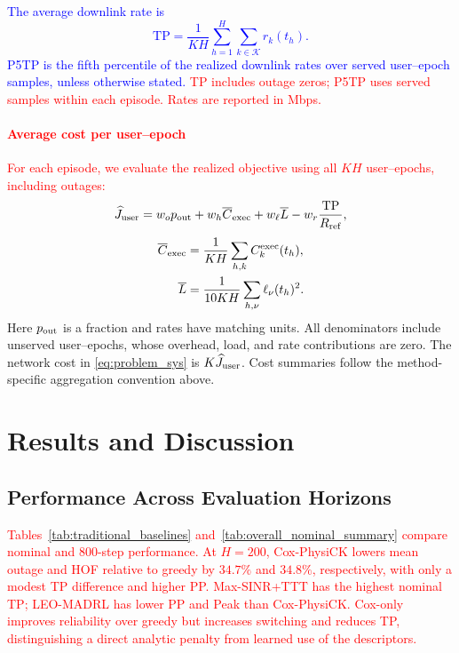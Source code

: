 \documentclass[10pt,letterpaper,journal]{IEEEtran}
\newcommand{\revnew}[1]{\textcolor{red}{#1}}
\begin{document}
\textcolor{blue}{The average downlink rate is
\begin{equation}
\mathrm{TP}
=
\frac{1}{KH}
\sum_{h=1}^{H}\sum_{k\in\mathcal K}r_k(t_h).
\end{equation}
P5TP is the fifth percentile of the realized downlink rates over served user--epoch samples, unless otherwise stated.}
\revnew{TP includes outage zeros; P5TP uses served samples within each episode. Rates are reported in Mbps.}


\paragraph{\revnew{Average cost per user--epoch}}
\revnew{For each episode, we evaluate the realized objective using all $KH$ user--epochs, including outages:}
\begingroup\color{red}
\[
\widehat J_{\rm user}
=w_o p_{\rm out}+w_h\overline C_{\rm exec}
+w_\ell\overline L-w_r\frac{\mathrm{TP}}{R_{\rm ref}},
\]
\[
\begin{aligned}
\overline C_{\rm exec}&=\frac{1}{KH}\sum_{h,k}C_k^{\rm exec}(t_h),\\
\overline L&=\frac{1}{10KH}\sum_{h,\nu}\ell_\nu(t_h)^2.
\end{aligned}
\]
Here $p_{\rm out}$ is a fraction and rates have matching units. All denominators include unserved user--epochs, whose overhead, load, and rate contributions are zero. The network cost in \eqref{eq:problem_sys} is $K\widehat J_{\rm user}$. Cost summaries follow the method-specific aggregation convention above.
\endgroup







\section{Results and Discussion}
\label{Results}

\subsection{Performance Across Evaluation Horizons}
\label{subsec:results_overall_nominal}

\revnew{Tables~\ref{tab:traditional_baselines} and~\ref{tab:overall_nominal_summary} compare nominal and 800-step performance. At $H=200$, Cox-PhysiCK lowers mean outage and HOF relative to greedy by $34.7\%$ and $34.8\%$, respectively, with only a modest TP difference and higher PP. Max-SINR+TTT has the highest nominal TP; LEO-MADRL has lower PP and Peak than Cox-PhysiCK. Cox-only improves reliability over greedy but increases switching and reduces TP, distinguishing a direct analytic penalty from learned use of the descriptors.}
\end{document}
